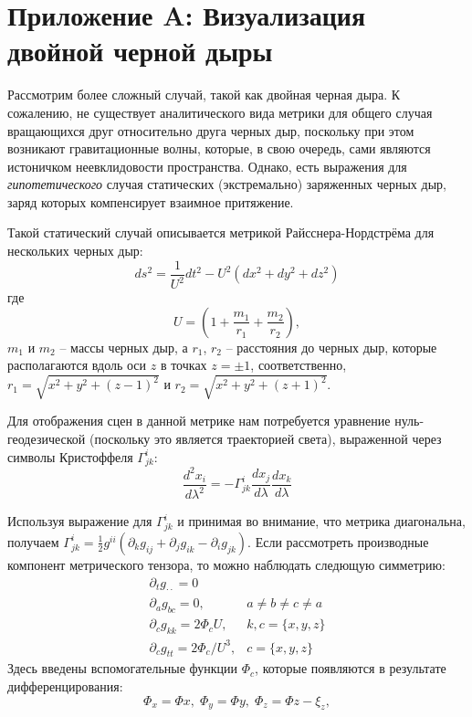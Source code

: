 \appendix
\section*{Приложение A: Визуализация двойной черной дыры}
\label{sec:Apendix1} 

Рассмотрим более сложный случай, такой как двойная черная дыра.  К сожалению, не существует аналитического вида метрики для общего случая 
вращающихся друг относительно друга черных дыр, поскольку при этом возникают гравитационные волны, которые, в свою очередь, сами являются истоничком  неевклидовости пространства. Однако, есть выражения для  \emph{гипотетического} случая статических (экстремально)  заряженных черных дыр, заряд которых компенсирует взаимное притяжение. 

Такой статический случай описывается метрикой Райсснера-Нордстрёма \cite{Contopoulos2004ChaosIT}
для нескольких черных дыр:
\begin{equation}
\label{eq:reissner-nordstrom} 
ds^2 = \frac{1}{U^2}dt^2 - U^2(dx^2+dy^2+dz^2)
\end{equation}
где 
$$
	U = (1+\frac{m_1}{r_1}+\frac{m_2}{r_2}),
$$
$m_1$ и $m_2$ -- массы черных дыр, а  $r_1$, $r_2$ -- расстояния до черных дыр, которые располагаются вдоль оси $z$ в точках $z =\pm 1$, соответственно,
$r_1 = \sqrt{x^2+y^2+(z-1)^2}$ и $r_2 = \sqrt{x^2+y^2+(z+1)^2}$.

Для отображения сцен в данной метрике нам потребуется уравнение нуль-геодезической (поскольку это является траекторией света), выраженной через символы Кристоффеля $\Gamma^i_{jk}$:
\begin{equation}
\label{eq:geodesic}
	\frac{d^2 x_i}{d\lambda^2} = -\Gamma^i_{jk}\frac{d x_j}{d\lambda}\frac{d x_k}{d\lambda}
\end{equation}


Используя выражение для $\Gamma^i_{jk}$ и принимая во внимание, что метрика диагональна, получаем $\Gamma^i_{jk} = \frac{1}{2}g^{ii}(\partial_k g_{ij} + \partial_j g_{ik}-\partial_i g_{jk})$.
Если рассмотреть производные компонент метрического тензора, то можно наблюдать следющую симметрию:
\begin{equation}
	\begin{array}{cl}
		\partial_t g_{\cdot\cdot} = 0 &  \\
		\partial_a g_{bc} = 0, & a\ne b\ne c\ne a \\
		\partial_c g_{kk} = 2\Phi_c U, & k,c = \{x, y, z\}  \\
		\partial_c g_{tt} = 2\Phi_c/U^3, & c = \{x, y, z\} 
	\end{array}
\end{equation}
Здесь введены вспомогательные функции $\Phi_c$, которые появляются в результате дифференцирования:
$$
\Phi_x = \Phi x,\; \Phi_y = \Phi y,\; \Phi_z = \Phi z - \xi_z,
$$

